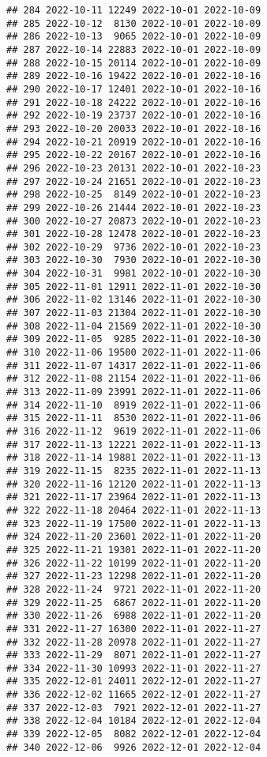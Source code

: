 \documentclass[
]{article}
\begin{document}
\begin{verbatim}
## 284 2022-10-11 12249 2022-10-01 2022-10-09
## 285 2022-10-12  8130 2022-10-01 2022-10-09
## 286 2022-10-13  9065 2022-10-01 2022-10-09
## 287 2022-10-14 22883 2022-10-01 2022-10-09
## 288 2022-10-15 20114 2022-10-01 2022-10-09
## 289 2022-10-16 19422 2022-10-01 2022-10-16
## 290 2022-10-17 12401 2022-10-01 2022-10-16
## 291 2022-10-18 24222 2022-10-01 2022-10-16
## 292 2022-10-19 23737 2022-10-01 2022-10-16
## 293 2022-10-20 20033 2022-10-01 2022-10-16
## 294 2022-10-21 20919 2022-10-01 2022-10-16
## 295 2022-10-22 20167 2022-10-01 2022-10-16
## 296 2022-10-23 20131 2022-10-01 2022-10-23
## 297 2022-10-24 21651 2022-10-01 2022-10-23
## 298 2022-10-25  8149 2022-10-01 2022-10-23
## 299 2022-10-26 21444 2022-10-01 2022-10-23
## 300 2022-10-27 20873 2022-10-01 2022-10-23
## 301 2022-10-28 12478 2022-10-01 2022-10-23
## 302 2022-10-29  9736 2022-10-01 2022-10-23
## 303 2022-10-30  7930 2022-10-01 2022-10-30
## 304 2022-10-31  9981 2022-10-01 2022-10-30
## 305 2022-11-01 12911 2022-11-01 2022-10-30
## 306 2022-11-02 13146 2022-11-01 2022-10-30
## 307 2022-11-03 21304 2022-11-01 2022-10-30
## 308 2022-11-04 21569 2022-11-01 2022-10-30
## 309 2022-11-05  9285 2022-11-01 2022-10-30
## 310 2022-11-06 19500 2022-11-01 2022-11-06
## 311 2022-11-07 14317 2022-11-01 2022-11-06
## 312 2022-11-08 21154 2022-11-01 2022-11-06
## 313 2022-11-09 23991 2022-11-01 2022-11-06
## 314 2022-11-10  8919 2022-11-01 2022-11-06
## 315 2022-11-11  8530 2022-11-01 2022-11-06
## 316 2022-11-12  9619 2022-11-01 2022-11-06
## 317 2022-11-13 12221 2022-11-01 2022-11-13
## 318 2022-11-14 19881 2022-11-01 2022-11-13
## 319 2022-11-15  8235 2022-11-01 2022-11-13
## 320 2022-11-16 12120 2022-11-01 2022-11-13
## 321 2022-11-17 23964 2022-11-01 2022-11-13
## 322 2022-11-18 20464 2022-11-01 2022-11-13
## 323 2022-11-19 17500 2022-11-01 2022-11-13
## 324 2022-11-20 23601 2022-11-01 2022-11-20
## 325 2022-11-21 19301 2022-11-01 2022-11-20
## 326 2022-11-22 10199 2022-11-01 2022-11-20
## 327 2022-11-23 12298 2022-11-01 2022-11-20
## 328 2022-11-24  9721 2022-11-01 2022-11-20
## 329 2022-11-25  6867 2022-11-01 2022-11-20
## 330 2022-11-26  6988 2022-11-01 2022-11-20
## 331 2022-11-27 16300 2022-11-01 2022-11-27
## 332 2022-11-28 20978 2022-11-01 2022-11-27
## 333 2022-11-29  8071 2022-11-01 2022-11-27
## 334 2022-11-30 10993 2022-11-01 2022-11-27
## 335 2022-12-01 24011 2022-12-01 2022-11-27
## 336 2022-12-02 11665 2022-12-01 2022-11-27
## 337 2022-12-03  7921 2022-12-01 2022-11-27
## 338 2022-12-04 10184 2022-12-01 2022-12-04
## 339 2022-12-05  8082 2022-12-01 2022-12-04
## 340 2022-12-06  9926 2022-12-01 2022-12-04

\end{verbatim}
\end{document}
